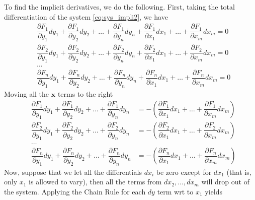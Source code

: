 \documentclass[10pt,a4paper]{book}
\theoremstyle{definition}\newtheorem{definition}{Definition}
\theoremstyle{definition}\newtheorem{fact}{Fact}
\theoremstyle{definition}\newtheorem{ex}{Ex.}
\theoremstyle{definition}\newtheorem{project}{Project}
\theoremstyle{definition}\newtheorem{problem}{Problem}
\theoremstyle{definition}\newtheorem{example}{Example}
\numberwithin{theorem}{chapter}
\numberwithin{corollary}{chapter}
\numberwithin{assumption}{chapter}
\numberwithin{definition}{chapter}
\numberwithin{prop}{chapter}
\numberwithin{notation}{chapter}
\numberwithin{problem}{chapter}
\numberwithin{example}{chapter}
\numberwithin{fact}{chapter}
\numberwithin{ex}{chapter}
\def\x{\mathbf x}
\begin{document}
	To find the implicit derivatives, we do the following. First, taking the total differentiation of the system \eqref{eq:sys_impli2}, we have
	\begin{align*}
		&\dfrac{\partial F_1}{\partial y_1} dy_1 + \dfrac{\partial F_1}{\partial y_2} dy_2 + \dots + \dfrac{\partial F_1}{\partial y_n} dy_n + \dfrac{\partial F_1}{\partial x_1} dx_1 + \dots + \dfrac{\partial F_1}{\partial x_m} dx_m = 0 \\
		&\dfrac{\partial F_2}{\partial y_1} dy_1 + \dfrac{\partial F_2}{\partial y_2} dy_2 + \dots + \dfrac{\partial F_2}{\partial y_n} dy_n + \dfrac{\partial F_2}{\partial x_1} dx_1 + \dots + \dfrac{\partial F_2}{\partial x_m} dx_m = 0 \\
		&\dots \\
		&\dfrac{\partial F_n}{\partial y_1} dy_1 + \dfrac{\partial F_n}{\partial y_2} dy_2 + \dots + \dfrac{\partial F_n}{\partial y_n} dy_n + \dfrac{\partial F_n}{\partial x_1} dx_1 + \dots + \dfrac{\partial F_n}{\partial x_m} dx_m = 0
	\end{align*}
	Moving all the $\x$ terms to the right
	\begin{align*}
		&\dfrac{\partial F_1}{\partial y_1} dy_1 + \dfrac{\partial F_1}{\partial y_2} dy_2 + \dots + \dfrac{\partial F_1}{\partial y_n} dy_n &= - \left( \dfrac{\partial F_1}{\partial x_1} dx_1 + \dots + \dfrac{\partial F_1}{\partial x_m} dx_m \right) \\
		&\dfrac{\partial F_2}{\partial y_1} dy_1 + \dfrac{\partial F_2}{\partial y_2} dy_2 + \dots + \dfrac{\partial F_2}{\partial y_n} dy_n &= - \left( \dfrac{\partial F_2}{\partial x_1} dx_1 + \dots + \dfrac{\partial F_2}{\partial x_m} dx_m \right) \\
		&\dots \\
		&\dfrac{\partial F_n}{\partial y_1} dy_1 + \dfrac{\partial F_n}{\partial y_2} dy_2 + \dots + \dfrac{\partial F_n}{\partial y_n} dy_n &= - \left( \dfrac{\partial F_n}{\partial x_1} dx_1 + \dots + \dfrac{\partial F_n}{\partial x_m} dx_m \right)
	\end{align*}
	Now, suppose that we let all the differentials $dx_i$ be zero except for $dx_1$ (that is, only $x_1$ is allowed to vary), then all the terms from $dx_2, \dots, dx_m$ will drop out of the system. Applying the Chain Rule for each $dy$ term wrt to $x_1$ yields
\end{document}
